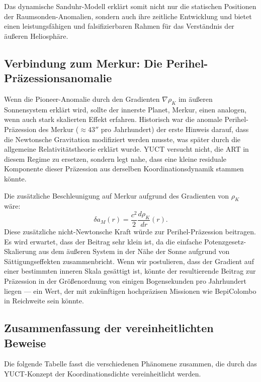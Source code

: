 \documentclass[12pt,a4paper]{article}
\theoremstyle{remark}
\begin{document}
	Das dynamische Sanduhr-Modell erklärt somit nicht nur die statischen Positionen der Raumsonden-Anomalien, sondern auch ihre zeitliche Entwicklung und bietet einen leistungsfähigen und falsifizierbaren Rahmen für das Verständnis der äußeren Heliosphäre.
	
	\subsection{Verbindung zum Merkur: Die Perihel-Präzessionsanomalie}
	\label{subsec:coord:mercury}
	
	Wenn die Pioneer-Anomalie durch den Gradienten $\nabla \rho_K$ im äußeren Sonnensystem erklärt wird, sollte der innerste Planet, Merkur, einen analogen, wenn auch stark skalierten Effekt erfahren. Historisch war die anomale Perihel-Präzession des Merkur ($\approx 43''$ pro Jahrhundert) der erste Hinweis darauf, dass die Newtonsche Gravitation modifiziert werden musste, was später durch die allgemeine Relativitätstheorie erklärt wurde. YUCT versucht nicht, die ART in diesem Regime zu ersetzen, sondern legt nahe, dass eine kleine residuale Komponente dieser Präzession aus derselben Koordinationsdynamik stammen könnte.
	
	Die zusätzliche Beschleunigung auf Merkur aufgrund des Gradienten von $\rho_K$ wäre:
	\begin{equation}
		\delta a_M(r) = \frac{c^2}{2} \frac{d\rho_K}{dr}(r).
	\end{equation}
	Diese zusätzliche nicht-Newtonsche Kraft würde zur Perihel-Präzession beitragen. Es wird erwartet, dass der Beitrag sehr klein ist, da die einfache Potenzgesetz-Skalierung aus dem äußeren System in der Nähe der Sonne aufgrund von Sättigungseffekten zusammenbricht. Wenn wir postulieren, dass der Gradient auf einer bestimmten inneren Skala gesättigt ist, könnte der resultierende Beitrag zur Präzession in der Größenordnung von einigen Bogensekunden pro Jahrhundert liegen — ein Wert, der mit zukünftigen hochpräzisen Missionen wie BepiColombo in Reichweite sein könnte.
	
	\subsection{Zusammenfassung der vereinheitlichten Beweise}
	
	Die folgende Tabelle fasst die verschiedenen Phänomene zusammen, die durch das YUCT-Konzept der Koordinationsdichte vereinheitlicht werden.
	
\end{document}
